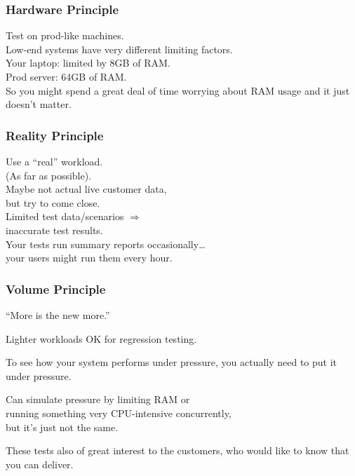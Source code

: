 \begin{frame}
\frametitle{Hardware Principle}

\large
\begin{changemargin}{2cm}
Test on prod-like machines.\\[1em]
Low-end systems have very different limiting factors. \\[1em]
Your laptop: limited by 8GB of RAM.\\
Prod server: 64GB of RAM.\\[1em]
So you might spend a great deal of time worrying about RAM usage and it just doesn't matter.
\end{changemargin}

\end{frame}



\begin{frame}
\frametitle{Reality Principle}
\large
\begin{changemargin}{2cm}
Use a ``real'' workload.\\
(As far as possible).\\[1em]
Maybe not actual live customer data,\\
but try to come close.\\[1em]
Limited test data/scenarios $\Rightarrow$ \\
\qquad inaccurate test results.\\[1em]
Your tests run summary reports occasionally\ldots\\
your users might run them every hour. 
\end{changemargin}
\end{frame}



\begin{frame}
\frametitle{Volume Principle}
\large
\begin{changemargin}{2cm}
``More is the new more.'' 

Lighter workloads OK for regression testing. 

To see how your system performs under pressure, you actually need to put it under pressure. 

Can simulate pressure by limiting RAM or\\ running something very CPU-intensive concurrently,\\
but it's just not the same.

These tests also  of great interest to the customers, who would like to know that you can deliver. 
\end{changemargin}

\end{frame}



